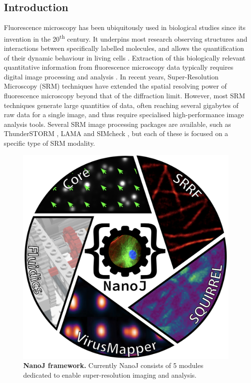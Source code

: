 \subsection*{Introduction}
Fluorescence microscopy has been ubiquitously used in biological studies since its invention in the 20\textsuperscript{th} century. It underpins most research observing structures and interactions between specifically labelled molecules, and allows the quantification of their dynamic behaviour in living cells \cite{rino2009frontiers}. Extraction of this biologically relevant quantitative information from fluorescence microscopy data typically requires digital image processing and analysis \cite{wheeler2017standard}. In recent years, Super-Resolution Microscopy (SRM) techniques \cite{betzig2006imaging,rust2006sub,hell1994breaking} have extended the spatial resolving power of fluorescence microscopy beyond that of the diffraction limit. However, most SRM techniques generate large quantities of data, often reaching several gigabytes of raw data for a single image, and thus require specialised high-performance image analysis tools.  Several SRM image processing packages are available, such as ThunderSTORM \cite{ovesny2014thunderstorm}, LAMA \cite{Malkusch2016LAMA} and SIMcheck \cite{schermelleh2015simcheck}, but each of these is focused on a specific type of SRM modality.
  
 \begin{figure}[!t]
    \centering
    \includegraphics[width=\linewidth]{Figures/FigureMain_v3.png}
    \caption{\textbf{NanoJ framework.} Currently NanoJ consists of 5 modules dedicated to enable super-resolution imaging and analysis.}
    \label{fig:GeneralDiagram}
 \end{figure}
 
